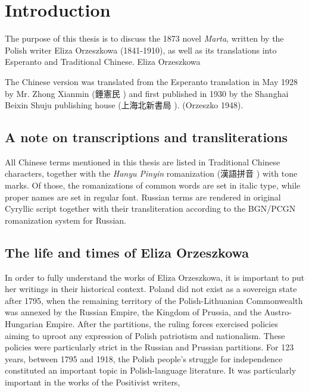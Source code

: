 \chapter{Introduction}

The purpose of this thesis is to discuss the 1873 novel \textit{Marta}, written by the Polish writer Eliza Orzeszkowa (1841-1910), as well as its translations into Esperanto and Traditional Chinese.
Eliza Orzeszkowa 

The Chinese version was translated from the Esperanto translation in May 1928 by Mr. Zhong Xianmin (錘憲民 ) and first published in 1930 by the Shanghai Beixin Shuju publishing house (上海北新書局 ).
(Orzeszko 1948).

\section{A note on transcriptions and transliterations}

All Chinese terms mentioned in this thesis are listed in Traditional Chinese characters, together with the \textit{Hanyu Pinyin} romanization (漢語拼音 ) with tone marks. Of those, the romanizations of common words are set in italic type, while proper names are set in regular font. Russian terms are rendered in original Cyryllic script together with their transliteration according to the BGN/PCGN romanization system for Russian.

\section{The life and times of Eliza Orzeszkowa}

In order to fully understand the works of Eliza Orzeszkowa, it is important to put her writings in their historical context.
Poland did not exist as a sovereign state after 1795, when the remaining territory of the Polish-Lithuanian Commonwealth was annexed by the Russian Empire, the  Kingdom of Prussia, and the Austro-Hungarian Empire.
After the partitions, the ruling forces exercised policies aiming to uproot any expression of Polish patriotism and nationalism. These policies were particularly strict in the Russian and Prussian partitions.
For 123 years, between 1795 and 1918, the Polish people's struggle for independence constituted an important topic in Polish-language literature.
It was particularly important in the works of the Positivist writers, 

